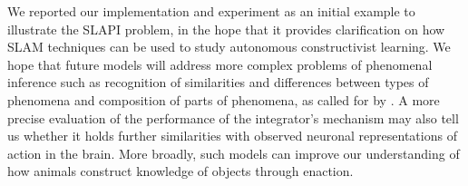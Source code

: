 \documentclass[pmlr]{jmlr}%
\begin{document}
We reported our implementation and experiment as an initial example to illustrate the SLAPI problem, in the hope that it provides clarification on how SLAM techniques can be used to study autonomous constructivist learning. 
We hope that future models will address more complex problems of phenomenal inference such as recognition of similarities and differences between types of phenomena and composition of parts of phenomena, as called for by \cite{hawkins_framework_2019}. 
A more precise evaluation of the performance of the integrator's mechanism may also tell us whether it holds further similarities with observed neuronal representations of action in the brain. 
More broadly, such models can improve our understanding of how animals construct knowledge of objects through enaction. 




\end{document}
